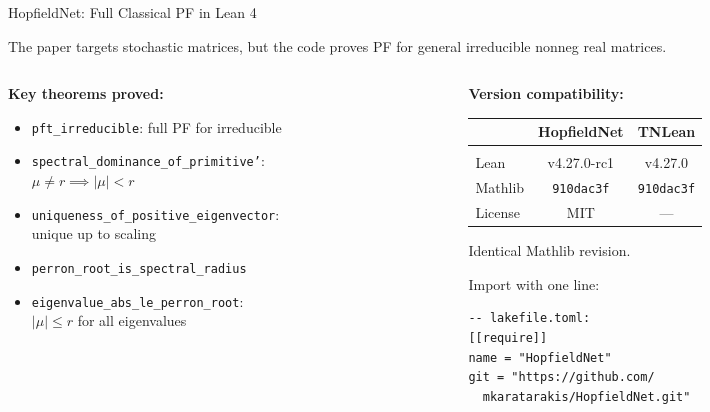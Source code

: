 \documentclass[aspectratio=169,10pt]{beamer}
\begin{document}
\begin{frame}[fragile]{HopfieldNet: Full Classical PF in Lean 4}

The paper targets stochastic matrices, but the code proves PF for \alert{general irreducible nonneg real matrices}.

\vspace{0.3em}
\begin{columns}[T]
\begin{column}{0.48\textwidth}
\textbf{Key theorems proved:}
\begin{itemize}\small
  \item \texttt{pft\_irreducible}: full PF for irreducible
  \item \texttt{spectral\_dominance\_of\_primitive'}: \\$\mu \neq r \implies |\mu| < r$
  \item \texttt{uniqueness\_of\_positive\_eigenvector}: \\unique up to scaling
  \item \texttt{perron\_root\_is\_spectral\_radius}
  \item \texttt{eigenvalue\_abs\_le\_perron\_root}: \\$|\mu| \leq r$ for all eigenvalues
\end{itemize}
\end{column}
\begin{column}{0.48\textwidth}
\textbf{Version compatibility:}

\vspace{0.3em}
\begin{tabular}{lcc}
  & \textbf{HopfieldNet} & \textbf{TNLean} \\
  \hline\\
  Lean & v4.27.0-rc1 & v4.27.0 \\
  Mathlib & \texttt{910dac3f} & \texttt{910dac3f} \\
  License & MIT & --- \\
\end{tabular}

\vspace{0.5em}
\textcolor{leangreen}{Identical Mathlib revision.}

\vspace{0.3em}
Import with one line:
\begin{lstlisting}
-- lakefile.toml:
[[require]]
name = "HopfieldNet"
git = "https://github.com/
  mkaratarakis/HopfieldNet.git"
\end{lstlisting}
\end{column}
\end{columns}
\end{frame}
\end{document}
